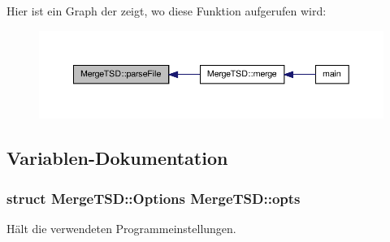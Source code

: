 Hier ist ein Graph der zeigt, wo diese Funktion aufgerufen wird\-:
\nopagebreak
\begin{figure}[H]
\begin{center}
\leavevmode
\includegraphics[width=350pt]{namespaceMergeTSD_ad380b92e7e702006d21b99bf6ebbe5cf_icgraph}
\end{center}
\end{figure}




\subsection{Variablen-\/\-Dokumentation}
\hypertarget{namespaceMergeTSD_ab092916b5f92cd3ab10306e8cbf417fa}{
\subsubsection[{opts}]{\setlength{\rightskip}{0pt plus 5cm}struct {\bf Merge\-T\-S\-D\-::\-Options}  Merge\-T\-S\-D\-::opts}}\label{namespaceMergeTSD_ab092916b5f92cd3ab10306e8cbf417fa}


Hält die verwendeten Programmeinstellungen. 

